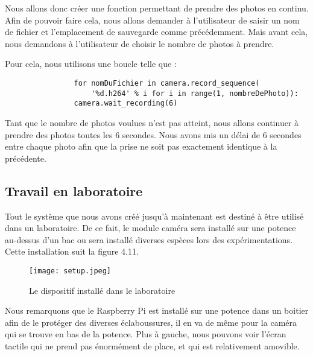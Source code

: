         Nous allons donc créer une fonction permettant de prendre des photos en continu.
        Afin de pouvoir faire cela, nous allons demander à l'utilisateur de saisir un nom de fichier et l'emplacement de sauvegarde comme précédemment.
        Mais avant cela, nous demandons à l'utilisateur de choisir le nombre de photos à prendre.

        \vspace{0.5cm}

        \begin{flushleft}
            Pour cela, nous utilisons une boucle telle que : 
            \begin{verbatim}
                for nomDuFichier in camera.record_sequence(
                    '%d.h264' % i for i in range(1, nombreDePhoto)):
                camera.wait_recording(6)
            \end{verbatim}            
        \end{flushleft}

        \vspace{0.7cm}

        Tant que le nombre de photos voulues n'est pas atteint, nous allons continuer à prendre des photos toutes les 6 secondes. Nous avons mis un délai de 6 secondes entre chaque photo afin que la prise ne soit pas exactement identique à la précédente.
    
        \subsection{Travail en laboratoire}
        Tout le système que nous avons créé jusqu'à maintenant est destiné à être utilisé dans un laboratoire. De ce fait, le module caméra sera installé sur une potence au-dessus d'un bac ou sera installé diverses espèces lors des expérimentations. Cette installation suit la figure 4.11.

        \begin{figure}[ht]
            \centering
            \texttt{[image: setup.jpeg]} 
            \caption{Le dispositif installé dans le laboratoire}
        \end{figure} 

        Nous remarquons que le Raspberry Pi est installé sur une potence dans un boitier afin de le protéger des diverses éclaboussures, il en va de même pour la caméra qui se trouve en bas de la potence. Plus à gauche, nous pouvons voir l'écran tactile qui ne prend pas énormément de place, et qui est relativement amovible.

